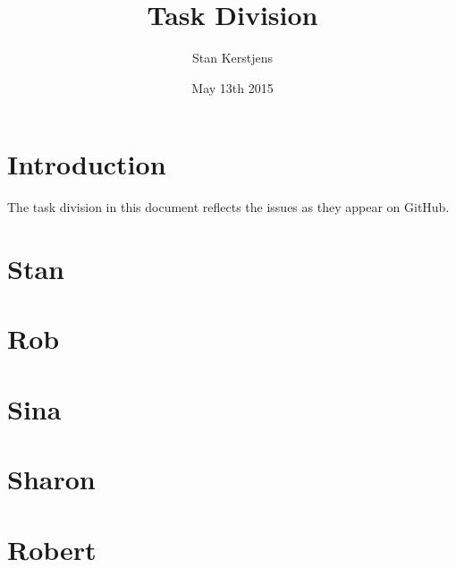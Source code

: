 \documentclass[a4paper]{article}
\title{Task Division}
\author{Stan Kerstjens}
\date{May 13th 2015}
\begin{document}
	\maketitle

	\section{Introduction}
		The task division in this document reflects the issues as they appear on GitHub.
	\section{Stan}
		
	\section{Rob}
		
	\section{Sina}
		
	\section{Sharon}
		
	\section{Robert}
		
\end{document}

